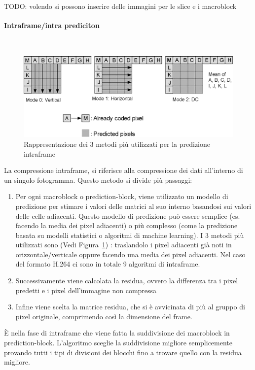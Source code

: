 \documentclass[a4paper,12pt, oneside]{article}
\begin{document}
TODO: volendo si possono inserire delle immagini per le slice e i macroblock

\paragraph{Intraframe/intra prediciton}\hphantom{A}\\
\begin{figure}[h]
    \centering
    \includegraphics[width=1\textwidth]{images/intraframe-algo.png}
    \caption{Rappresentazione dei 3 metodi più utilizzati per la predizione intraframe}
    \label{fig:intraframe_algo}
\end{figure}
La compressione intraframe, si riferisce alla compressione dei dati all'interno di un singolo
fotogramma. Questo metodo si divide più passaggi:
\begin{enumerate}
  \item Per ogni macroblock o prediction-block, viene utilizzato un modello di predizione per stimare
  i valori delle matrici al suo interno basandosi sui valori delle celle adiacenti. Questo modello di
  predizione può essere semplice (es. facendo la media dei pixel adiacenti) o più complesso (come la
  predizione basata su modelli statistici o algoritmi di machine learning). I 3 metodi più utilizzati
  sono (Vedi Figura~\ref{fig:intraframe_algo}) : traslandolo i pixel adiacenti già noti in
  orizzontale/verticale oppure facendo una media dei pixel adiacenti.
  Nel caso del formato H.264 ci sono in totale 9 algoritmi di intraframe.
  \item Successivamente viene calcolata la residua, ovvero la differenza tra i pixel predetti e i
  pixel dell'immagine non compressa
  \item Infine viene scelta la matrice residua, che si è avvicinata di più al gruppo di pixel originale,
  comprimendo così la dimensione del frame.
\end{enumerate}
È nella fase di intraframe che viene fatta la suddivisione dei macroblock in prediction-block.
L'algoritmo sceglie la suddivisione migliore semplicemente provando tutti i tipi di divisioni dei
blocchi fino a trovare quello con la residua migliore.
\end{document}
